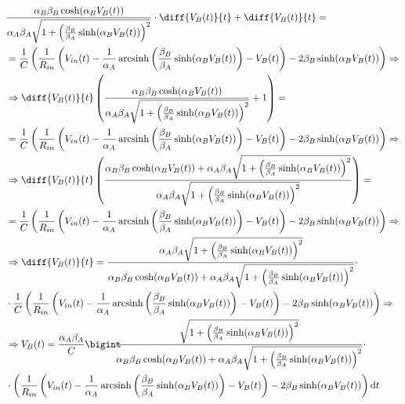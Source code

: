 	\begin{equation}
		\label{eq:sostituzione}
		\begin{split}
			&\frac{\alpha_{B}\beta_{B}\cosh(\alpha_{B}V_{B}(t))}{\alpha_{A}\beta_{A}\sqrt{1+\left(\frac{\beta_{B}}{\beta_{A}}\sinh(\alpha_{B}V_{B}(t))\right)^{2}}}\cdot\diff{V_{B}(t)}{t}+\diff{V_{B}(t)}{t} =\\&= \frac{1}{C}\left(\frac{1}{R_{in}}\left(V_{in}(t)-\frac{1}{\alpha_{A}} \arcsinh \left(\frac{\beta_{B}}{\beta_{A}} \sinh(\alpha_{B}V_{B}(t))\right)-V_{B}(t)\right)-2\beta_{B}\sinh(\alpha_{B}V_{B}(t))\right)\Rightarrow\\
			&\Rightarrow \diff{V_{B}(t)}{t}\left(\frac{\alpha_{B}\beta_{B}\cosh(\alpha_{B}V_{B}(t))}{\alpha_{A}\beta_{A}\sqrt{1+\left(\frac{\beta_{B}}{\beta_{A}}\sinh(\alpha_{B}V_{B}(t))\right)^{2}}}+1\right) =\\&= \frac{1}{C}\left(\frac{1}{R_{in}}\left(V_{in}(t)-\frac{1}{\alpha_{A}} \arcsinh \left(\frac{\beta_{B}}{\beta_{A}} \sinh(\alpha_{B}V_{B}(t))\right)-V_{B}(t)\right)-2\beta_{B}\sinh(\alpha_{B}V_{B}(t))\right)\Rightarrow\\
			&\Rightarrow \diff{V_{B}(t)}{t}\left(\frac{\alpha_{B}\beta_{B}\cosh(\alpha_{B}V_{B}(t))+\alpha_{A}\beta_{A}\sqrt{1+\left(\frac{\beta_{B}}{\beta_{A}}\sinh(\alpha_{B}V_{B}(t))\right)^{2}}}{\alpha_{A}\beta_{A}\sqrt{1+\left(\frac{\beta_{B}}{\beta_{A}}\sinh(\alpha_{B}V_{B}(t))\right)^{2}}}\right) =\\&= \frac{1}{C}\left(\frac{1}{R_{in}}\left(V_{in}(t)-\frac{1}{\alpha_{A}} \arcsinh \left(\frac{\beta_{B}}{\beta_{A}} \sinh(\alpha_{B}V_{B}(t))\right)-V_{B}(t)\right)-2\beta_{B}\sinh(\alpha_{B}V_{B}(t))\right)\Rightarrow\\
			&\Rightarrow \diff{V_{B}(t)}{t} = \frac{\alpha_{A}\beta_{A}\sqrt{1+\left(\frac{\beta_{B}}{\beta_{A}}\sinh(\alpha_{B}V_{B}(t))\right)^{2}}}{\alpha_{B}\beta_{B}\cosh(\alpha_{B}V_{B}(t))+\alpha_{A}\beta_{A}\sqrt{1+\left(\frac{\beta_{B}}{\beta_{A}}\sinh(\alpha_{B}V_{B}(t))\right)^{2}}}\cdot\\&\cdot\frac{1}{C}\left(\frac{1}{R_{in}}\left(V_{in}(t)-\frac{1}{\alpha_{A}} \arcsinh \left(\frac{\beta_{B}}{\beta_{A}} \sinh(\alpha_{B}V_{B}(t))\right)-V_{B}(t)\right)-2\beta_{B}\sinh(\alpha_{B}V_{B}(t))\right)\Rightarrow\\
			&\Rightarrow V_{B}(t) = \frac{\alpha_{A}\beta_{A}}{C}\Int{\frac{\sqrt{1+\left(\frac{\beta_{B}}{\beta_{A}}\sinh(\alpha_{B}V_{B}(t))\right)^{2}}}{\alpha_{B}\beta_{B}\cosh(\alpha_{B}V_{B}(t))+\alpha_{A}\beta_{A}\sqrt{1+\left(\frac{\beta_{B}}{\beta_{A}}\sinh(\alpha_{B}V_{B}(t))\right)^{2}}}\cdot\\&\cdot\left(\frac{1}{R_{in}}\left(V_{in}(t)-\frac{1}{\alpha_{A}} \arcsinh \left(\frac{\beta_{B}}{\beta_{A}} \sinh(\alpha_{B}V_{B}(t))\right)-V_{B}(t)\right)-2\beta_{B}\sinh(\alpha_{B}V_{B}(t))\right)}{t}\\
		\end{split}
	\end{equation}
	
